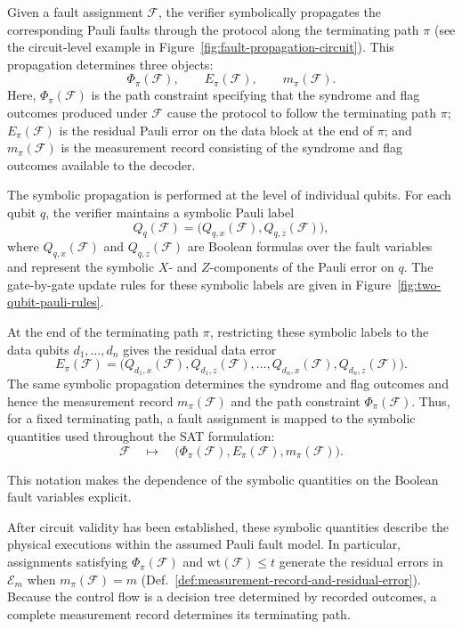 \documentclass[acmsmall,screen,review,anonymous,nonacm]{acmart}
\begin{document}
Given a fault assignment $\mathcal{F}$, the verifier symbolically propagates
the corresponding Pauli faults through the protocol along the terminating path
$\pi$ (see the circuit-level example in Figure~\ref{fig:fault-propagation-circuit}).
This propagation determines three objects:
\[
\Phi_\pi(\mathcal{F}),\qquad
E_\pi(\mathcal{F}),\qquad
m_\pi(\mathcal{F}).
\]
Here, $\Phi_\pi(\mathcal{F})$ is the path constraint specifying that the
syndrome and flag outcomes produced under $\mathcal{F}$ cause the protocol to
follow the terminating path $\pi$; $E_\pi(\mathcal{F})$ is the residual Pauli
error on the data block at the end of $\pi$; and
$m_\pi(\mathcal{F})$ is the measurement record consisting of the syndrome and
flag outcomes available to the decoder.

The symbolic propagation is performed at the level of individual qubits.
For each qubit $q$, the verifier maintains a symbolic Pauli label
\[
Q_q(\mathcal{F})
=
\bigl(
Q_{q,x}(\mathcal{F}),
Q_{q,z}(\mathcal{F})
\bigr),
\]
where $Q_{q,x}(\mathcal{F})$ and $Q_{q,z}(\mathcal{F})$ are Boolean formulas
over the fault variables and represent the symbolic $X$- and $Z$-components
of the Pauli error on $q$. The gate-by-gate update rules for these symbolic
labels are given in Figure~\ref{fig:two-qubit-pauli-rules}.

At the end of the terminating path $\pi$, restricting these symbolic labels to
the data qubits $d_1,\ldots,d_n$ gives the residual data error
\[
E_\pi(\mathcal{F})
=
\bigl(
Q_{d_1,x}(\mathcal{F}),Q_{d_1,z}(\mathcal{F}),
\ldots,
Q_{d_n,x}(\mathcal{F}),Q_{d_n,z}(\mathcal{F})
\bigr).
\]
The same symbolic propagation determines the syndrome and flag outcomes and
hence the measurement record $m_\pi(\mathcal{F})$ and the path constraint
$\Phi_\pi(\mathcal{F})$. Thus, for a fixed terminating path, a fault
assignment is mapped to the symbolic quantities used throughout the SAT
formulation:
\[
\mathcal{F}
\quad\longmapsto\quad
\bigl(
\Phi_\pi(\mathcal{F}),
E_\pi(\mathcal{F}),
m_\pi(\mathcal{F})
\bigr).
\]

This notation makes the dependence of the symbolic quantities on the Boolean
fault variables explicit.

After circuit validity has been established, these symbolic quantities
describe the physical executions within the assumed Pauli fault model.
In particular, assignments satisfying $\Phi_\pi(\mathcal F)$ and
$\mathrm{wt}(\mathcal F)\le t$ generate the residual errors in
$\mathcal E_m$ when $m_\pi(\mathcal F)=m$
(Def.~\ref{def:measurement-record-and-residual-error}).
Because the control flow is a decision tree determined by recorded
outcomes, a complete measurement record determines its terminating path.
\end{document}
